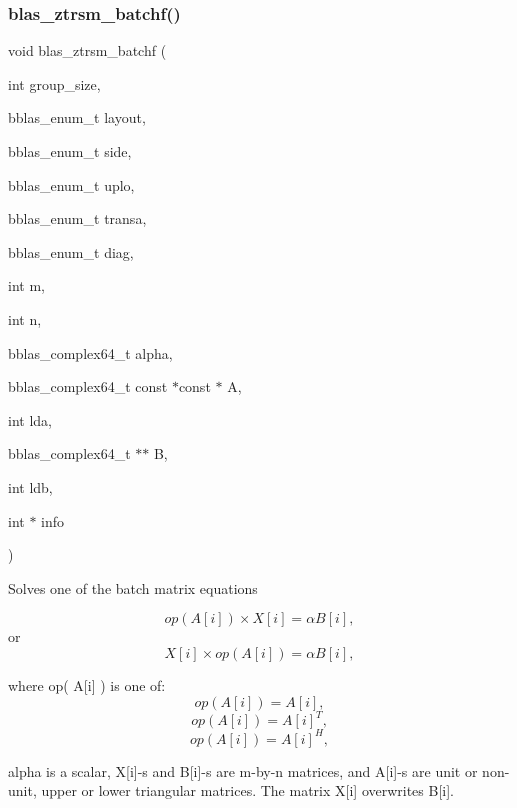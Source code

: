 \subsubsection{\texorpdfstring{blas\+\_\+ztrsm\+\_\+batchf()}{blas\_ztrsm\_batchf()}}
{\footnotesize\ttfamily void blas\+\_\+ztrsm\+\_\+batchf (\begin{DoxyParamCaption}\item[{int}]{group\+\_\+size,  }\item[{bblas\+\_\+enum\+\_\+t}]{layout,  }\item[{bblas\+\_\+enum\+\_\+t}]{side,  }\item[{bblas\+\_\+enum\+\_\+t}]{uplo,  }\item[{bblas\+\_\+enum\+\_\+t}]{transa,  }\item[{bblas\+\_\+enum\+\_\+t}]{diag,  }\item[{int}]{m,  }\item[{int}]{n,  }\item[{bblas\+\_\+complex64\+\_\+t}]{alpha,  }\item[{bblas\+\_\+complex64\+\_\+t const $\ast$const $\ast$}]{A,  }\item[{int}]{lda,  }\item[{bblas\+\_\+complex64\+\_\+t $\ast$$\ast$}]{B,  }\item[{int}]{ldb,  }\item[{int $\ast$}]{info }\end{DoxyParamCaption})}

Solves one of the batch matrix equations

\[ op( A[i] )\times X[i] = \alpha B[i], \] or \[ X[i] \times op( A[i] ) = \alpha B[i], \]

where op( A\mbox{[}i\mbox{]} ) is one of\+: \[ op( A[i] ) = A[i], \] \[ op( A[i] ) = A[i]^T, \] \[ op( A[i] ) = A[i]^H, \]

alpha is a scalar, X\mbox{[}i\mbox{]}-\/s and B\mbox{[}i\mbox{]}-\/s are m-\/by-\/n matrices, and A\mbox{[}i\mbox{]}-\/s are unit or non-\/unit, upper or lower triangular matrices. The matrix X\mbox{[}i\mbox{]} overwrites B\mbox{[}i\mbox{]}.


